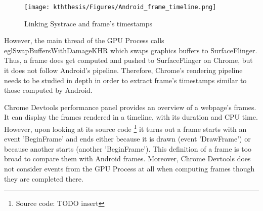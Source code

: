 \documentclass{kththesis}
\begin{document}
    \begin{figure}[!ht]
        \centering
        \texttt{[image: kththesis/Figures/Android\_frame\_timeline.png]}
        \caption{Linking Systrace and frame's timestamps}
        \label{fig:android_frame_timeline}
    \end{figure}
    However, the main thread of the GPU Process calls eglSwapBuffersWithDamageKHR which swaps graphics buffers to SurfaceFlinger. Thus, a frame does get computed and pushed to SurfaceFlinger on Chrome, but it does not follow Android's pipeline. Therefore, Chrome's rendering pipeline needs to be studied in depth in order to extract frame's timestamps similar to those computed by Android. 
    
    
    

    \fi
    

\iffalse
    
 Chrome Devtools performance panel provides an overview of a webpage's frames. It can display the frames rendered in a timeline, with its duration and CPU time. However, upon looking at its source code \footnote{Source code: TODO insert} it turns out a frame starts with an event 'BeginFrame' and ends either because it is drawn (event 'DrawFrame') or because another starts (another 'BeginFrame'). This definition of a frame is too broad to compare them with Android frames. Moreover, Chrome Devtools does not consider events from the GPU Process at all when computing frames though they are completed there.
\end{document}
